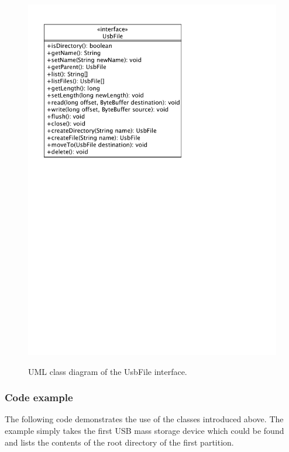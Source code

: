 \begin{figure}[h!]
\caption{UML class diagram of the UsbFile interface.}
\centering
\includegraphics[scale=0.85]{figures/usb_file}
\label{figure:usb_file}
\end{figure}

\subsubsection{Code example}

The following code demonstrates the use of the classes introduced above. The example simply takes the first USB mass storage device which could be found and lists the contents of the root directory of the first partition.

